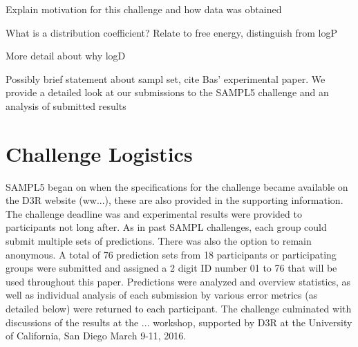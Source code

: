 Explain motivation for this challenge and how data was obtained %


What is a distribution coefficient? Relate to free energy, distinguish from logP

More detail about why logD 

Possibly brief statement about sampl set, cite Bas' experimental paper. We provide a detailed look at our submissions to the SAMPL5 challenge and an analysis of submitted results %


\section{Challenge Logistics}
\label{logistics}
SAMPL5 began on %
when the specifications for the challenge became available on the D3R website (ww...), these are also provided in the supporting information.  %
The challenge deadline was %
and experimental results were provided to participants not long after. 
As in past SAMPL challenges, each group could submit multiple sets of predictions.
There was also the option to remain anonymous.  
A total of 76 prediction sets from 18 participants or participating groups were submitted and assigned a 2 digit ID number 01 to 76 that will be used throughout this paper. 
Predictions were analyzed and overview statistics, as well as individual analysis of each submission by various error metrics (as detailed below) were returned to each participant. 
The challenge culminated with discussions of the results at  the ... workshop, supported by D3R %
at the University of California, San Diego March 9-11, 2016.

